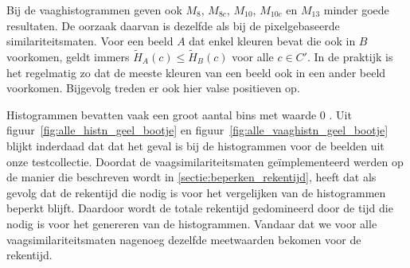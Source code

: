 Bij de vaaghistogrammen geven ook $M_8$, $M_{8c}$, $M_{10}$, $M_{10c}$ en $M_{13}$ minder goede resultaten.
De oorzaak daarvan is dezelfde als bij de pixelgebaseerde similariteitsmaten. Voor een beeld $A$ dat enkel
kleuren bevat die ook in $B$ voorkomen, geldt immers $\widetilde{H}_A(c) \leq \widetilde{H}_B(c)$ voor 
alle $c \in C'$. In de praktijk is het regelmatig zo dat de meeste kleuren van een beeld ook in een
ander beeld voorkomen. Bijgevolg treden er ook hier valse positieven op.

Histogrammen bevatten vaak een groot aantal bins met waarde $0$ \cite{berens:compressed_colour_histograms}. Uit 
figuur~\ref{fig:alle_histn_geel_bootje} en figuur~\ref{fig:alle_vaaghistn_geel_bootje} blijkt 
inderdaad dat dat het geval is bij de histogrammen voor de beelden uit onze testcollectie. 
Doordat de vaagsimilariteitsmaten ge\"implementeerd werden op de manier die beschreven wordt in 
\ref{sectie:beperken_rekentijd}, heeft dat als gevolg dat de rekentijd die nodig is voor het 
vergelijken van de histogrammen beperkt blijft. Daardoor wordt de totale rekentijd gedomineerd door 
de tijd die nodig is voor het genereren van de histogrammen. Vandaar dat we voor alle 
vaagsimilariteitsmaten nagenoeg dezelfde meetwaarden bekomen voor de rekentijd. 

